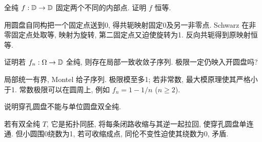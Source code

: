 \begin{exercise}
全纯 $f:\mathbb D\to\mathbb D$ 固定两个不同的内部点. 证明 $f$ 恒等.
\end{exercise}
\begin{solution}
用圆盘自同构把一个固定点送到0, 得共轭映射固定0及另一非零点. Schwarz 在非零固定点处取等, 映射为旋转, 第二固定点又迫使旋转为1. 反向共轭得到原映射恒等.
\end{solution}
\begin{exercise}
证明若 $f_n:\Omega\to\mathbb D$ 全纯, 则存在局部一致收敛子序列. 极限一定仍映入开圆盘吗?
\end{exercise}
\begin{solution}
局部统一有界, Montel 给子序列. 极限模至多1; 若非常数, 最大模原理使其严格小于1. 常数极限可以在圆周上, 例如 $f_n=1-1/n$ ($n\ge2$).
\end{solution}
\begin{exercise}
说明穿孔圆盘不能与单位圆盘双全纯.
\end{exercise}
\begin{solution}
若有双全纯 $T$, 它是拓扑同胚, 将每条闭路收缩与其逆一起拉回, 使穿孔圆盘单连通. 但小圆围0绕数为1, 若可收缩成点, 同伦不变性迫使其绕数为0, 矛盾.
\end{solution}

